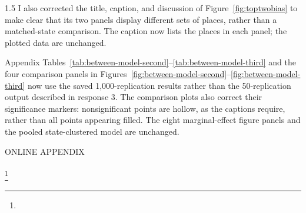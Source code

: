 \documentclass[12pt,english]{article}
\newcommand{\rrxspc}{1.5}
\begin{document}
\begin{refsection}
\begin{spacing}{\rrxspc}
        I also corrected the title, caption, and discussion of Figure~\ref{fig:toptwobias} to make clear that its two panels display different sets of places, rather than a matched-state comparison. The caption now lists the places in each panel; the plotted data are unchanged.

        Appendix Tables~\ref{tab:between-model-second}--\ref{tab:between-model-third} and the four comparison panels in Figures~\ref{fig:between-model-second}--\ref{fig:between-model-third} now use the saved 1{,}000-replication results rather than the 50-replication output described in response 3. The comparison plots also correct their significance markers: nonsignificant points are hollow, as the captions require, rather than all points appearing filled. The eight marginal-effect figure panels and the pooled state-clustered model are unchanged.
    \end{spacing}

    \end{refsection}

\clearpage
\pagebreak

\begin{refsection}
\setcounter{section}{0}
\renewcommand{\thesection}{\Alph{section}}
\renewcommand{\thesubsection}{\Alph{section}.\arabic{subsection}}
\renewcommand{\thesubsubsection}{\Alph{section}.\arabic{subsection}.\arabic{subsubsection}}

\renewcommand*{\thefootnote}{\fnsymbol{footnote}}
\begingroup
\doublespacing
\centering
\Large ONLINE APPENDIX \\[1.5em]
\LARGE \PAPERTITLE \\[0.75em]
\large
\AUTHORHADAH\footnote[1]{\AUTHORHADAHINFO}\\[1.0em]
\endgroup
\clearpage



\newpage
\pagebreak

\begingroup
{}
\setlength\bibitemsep{0pt}
\printbibliography[title=References for Online Appendix]
\endgroup
\pagebreak
\end{refsection}
\end{document}
